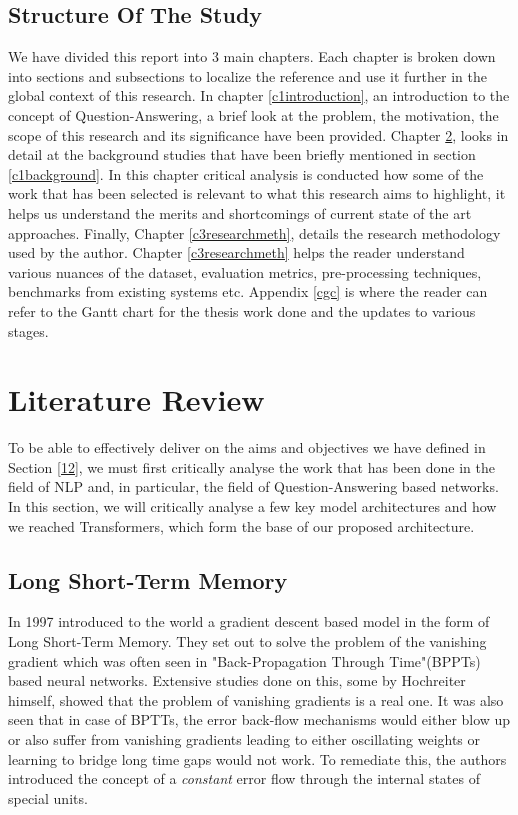 \documentclass[a4paper,12pt]{report}
\begin{document}
        \section{Structure Of The Study}\label{15}
           We have divided this report into 3 main chapters. Each chapter is broken down into sections and subsections to localize the reference and use it further in the global context of this research. In chapter \ref{c1introduction}, an introduction to the concept of Question-Answering, a brief look at the problem, the motivation, the scope of this research and its significance have been provided. Chapter \ref{c2litrev}, looks in detail at the background studies that have been briefly mentioned in section \ref{c1background}. In this chapter critical analysis is conducted how some of the work that has been selected is relevant to what this research aims to highlight, it helps us understand the merits and shortcomings of current state of the art approaches. Finally, Chapter \ref{c3researchmeth}, details the research methodology used by the author. Chapter \ref{c3researchmeth} helps the reader understand various nuances of the dataset, evaluation metrics, pre-processing techniques, benchmarks from existing systems etc.
           Appendix \ref{cgc} is where the reader can refer to the Gantt chart for the thesis work done and the updates to various stages.

    \chapter{Literature Review}\label{c2litrev}

    To be able to effectively deliver on the aims and objectives we have defined in Section \ref{12}, we must first critically analyse the work that has been done in the field of NLP and, in particular, the field of Question-Answering based networks. In this section, we will critically analyse a few key model architectures and how we reached Transformers, which form the base of our proposed architecture.

\citep{fastQA}

        \section{Long Short-Term Memory}\label{22}

            In 1997 \citep{lstmoriginal} introduced to the world a gradient descent based model in the form of Long Short-Term Memory. They set out to solve the problem of the vanishing gradient which was often seen in "Back-Propagation Through Time"(BPPTs) based neural networks. Extensive studies done on this, some by Hochreiter himself, showed that the problem of vanishing gradients is a real one. It was also seen that in case of BPTTs, the error back-flow mechanisms would either blow up or also suffer from vanishing gradients leading to either oscillating weights or learning to bridge long time gaps would not work. To remediate this, the authors introduced the concept of a \textit{constant} error flow through the internal states of special units.
\end{document}
